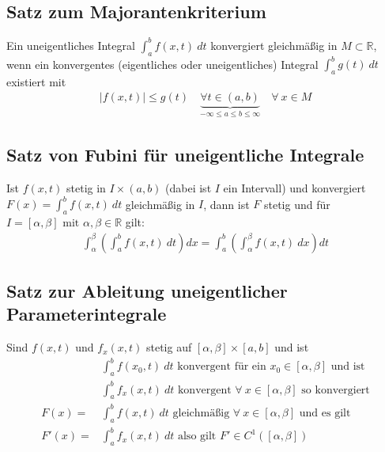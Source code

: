 \documentclass[11pt,a4paper]{book}
\newcommand {\R}	{\mathbb{R}}
\newcommand{\1}    	{\mathbbm{1}}
\newcommand{\mitt}	{\textrm{ mit }}
\begin{document}
\subsection{Satz zum Majorantenkriterium}
Ein uneigentliches Integral \(\int_a^b f(x,t) ~dt\) konvergiert gleichmäßig in \(M\subset\R\), wenn ein konvergentes (eigentliches oder uneigentliches) Integral \(\int_a^b g(t) ~dt\) existiert mit
\begin{align*}
	\left\vert f(x,t) \right\vert \leqslant g(t) \quad
	\underbrace{\forall t \in (a,b)}_{-\infty\leqslant a \leqslant b \leqslant\infty} \quad \forall~ x \in M
\end{align*} 

\subsection{Satz von Fubini für uneigentliche Integrale}
Ist \(f(x,t)\) stetig in \(I \times (a,b)\) (dabei ist \(I\) ein Intervall) und konvergiert \(F(x) = \int_a^b f(x,t) ~dt \) gleichmäßig in \(I\), dann ist \(F\) stetig und für \(I = [\alpha,\beta] \mitt \alpha,\beta \in \R\) gilt:
\begin{align*}
	\int_\alpha^\beta \left( \int_a^b f(x,t) ~dt \right) dx = 
	\int_a^b \left( \int_\alpha^\beta f(x,t) ~dx \right) dt
\end{align*} 

\subsection{Satz zur Ableitung uneigentlicher Parameterintegrale}
\label{sec:abl_uneigtl_paramint}
Sind \(f(x,t)\) und \(f_x(x,t)\) stetig auf \([\alpha,\beta]\times[a,b]\) und ist
\begin{align*}
	&\int_a^b f(x_0,t) ~dt \textrm{ konvergent für ein } x_0 \in [\alpha,\beta] \textrm{ und ist }\\
	&\int_a^b f_x(x,t) ~dt \textrm{ konvergent } \forall~ x \in [\alpha,\beta] \textrm{ so konvergiert} \\
	F(x) = &\int_a^b f(x,t) ~dt \textrm{ gleichmäßig } \forall~ x \in [\alpha,\beta] \textrm{ und es gilt } \\
	F'(x) = &\int_a^b f_x(x,t) ~dt \textrm{ also gilt } F' \in C^1([\alpha,\beta])
\end{align*}
\end{document}
